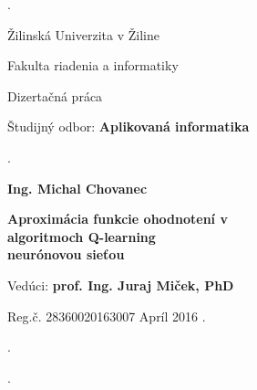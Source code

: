 \begin{titlepage}
\phantom.

\bigskip

\begin{center}
{\sc\LARGE Žilinská Univerzita v Žiline}
\medskip

{\sc\Large Fakulta riadenia a informatiky}

\vfill\vfill\vfill\vfill

{\sc\LARGE Dizertačná práca}

\medskip

{\large Študijný odbor: {\bf Aplikovaná informatika}}
\end{center}


\vfill\vfill\vfill\vfill


\phantom.\hfill
\begin{minipage}{10cm}
\begin{center}
{\large\bf Ing. Michal Chovanec}

\medskip

{\large\bf
  Aproximácia funkcie ohodnotení v \\
  algoritmoch Q-learning \\
  neurónovou sieťou
}

\medskip

Vedúci: {\bf prof. Ing. Juraj Miček, PhD}

\medskip

\hfill
Reg.č. 28360020163007
\hfill
Apríl 2016
\hfill\phantom.
\end{center}
\end{minipage}
\hspace{1.7cm}\phantom.

\vspace{2.9cm}

\phantom.
\end{titlepage}



\begin{abstract}

\noindent
{\sc Michal Chovanec:} {\em   Aproximácia funkcie ohodnotení v algoritmoch Q-learning neurónovou sieťou}
[Dizertačná práca]

\noindent
Žilinská Univerzita v~Žiline,
Fakulta riadenia a informatiky,
Katedra technickej kybernetiky.

\noindent
Vedúci: prof. Ing. Juraj Miček, PhD

\noindent
FRI ŽU v~Žiline, 2016

\bigskip

Práca sa zaoberá aproximáciou funkcie ohodnotení konania agenta, v algoritmoch Q-learning.
V priestoroch s malým počtom stavov predstavuje vhodné riešenie tabuľka.
Pre prípady veľkého počtu stavov je tabuľkové riešenie ťažko vypočítateľné. Je tak nutné použiť
aproximáciu. Vhodným kandidátom je neurónová sieť. Tradičné riešenie doprednej
siete je však nepoužiteľné z dôvodov nemožnosti takúto sieť učiť. V práci
je preto venovaný priestor neurónovej sieti bázických funkcií ktorú už je možné
na daný problém trénovať iteračnými metódami.

\end{abstract}


